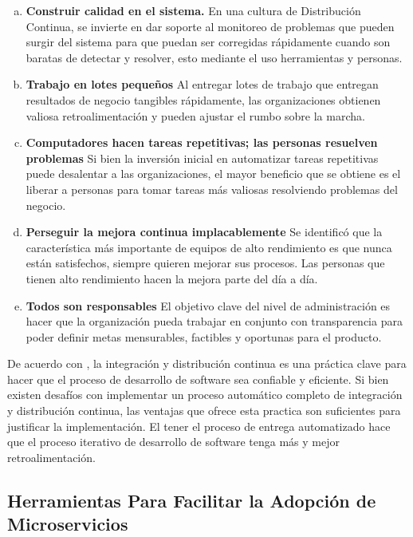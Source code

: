 \vspace{-1em}
\begin{enumerate}[a.]
  \item \textbf{Construir calidad en el sistema.}
    En una cultura de Distribución Continua, se invierte en dar soporte al monitoreo de problemas
    que pueden surgir del sistema para que puedan ser corregidas rápidamente cuando son baratas de
    detectar y resolver, esto mediante el uso herramientas y personas.
  \item \textbf{Trabajo en lotes pequeños}
    Al entregar lotes de trabajo que entregan resultados de negocio tangibles rápidamente,
    las organizaciones obtienen valiosa retroalimentación y pueden ajustar el rumbo sobre la
    marcha.
  \item \textbf{Computadores hacen tareas repetitivas; las personas resuelven problemas}
    Si bien la inversión inicial en automatizar tareas repetitivas puede desalentar a las organizaciones,
    el mayor beneficio que se obtiene es el liberar a personas para tomar tareas más valiosas resolviendo
    problemas del negocio.
  \item \textbf{Perseguir la mejora continua implacablemente}
    Se identificó que la característica más importante de equipos de alto rendimiento es que nunca
    están satisfechos, siempre quieren mejorar sus procesos.
    Las personas que tienen alto rendimiento hacen la mejora parte del día a día.
  \item \textbf{Todos son responsables}
    El objetivo clave del nivel de administración es hacer que la organización pueda trabajar en conjunto
    con transparencia para poder definir metas mensurables, factibles y oportunas para el producto.
\end{enumerate}
\vspace{-1em}

De acuerdo con \cite{forsgren2019}, la integración y distribución continua es una práctica clave
para hacer que el proceso de desarrollo de software sea confiable y eficiente.
Si bien existen desafíos con implementar un proceso automático completo de integración y distribución
continua, las ventajas que ofrece esta practica son suficientes para justificar la implementación.
El tener el proceso de entrega automatizado hace que el proceso iterativo de desarrollo de software
tenga más y mejor retroalimentación.


\subsection{Herramientas Para Facilitar la Adopción de Microservicios}


